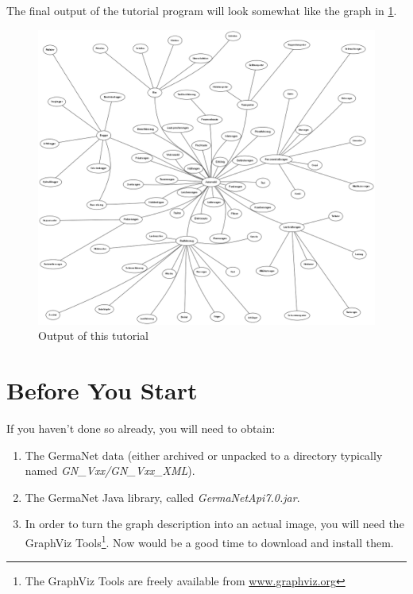 \documentclass[12pt,a4paper,english,utf8]{report}
\begin{document}
The final output of the tutorial program will look somewhat like the graph in \ref{autograph}.

\begin{figure}[htb] 
	\begin{center}
		\includegraphics[scale=0.3]{auto_graph.png}
	\end{center}
	\caption{Output of this tutorial}
	\label{autograph}
\end{figure}

\section{Before You Start}
\label{tutorialStarts}
If you haven't done so already, you will need to obtain:

\renewcommand{\labelenumi}{\arabic{enumi}}
\begin{enumerate}
	\item The GermaNet data (either archived or unpacked to a directory typically named \emph{GN\_Vxx/GN\_Vxx\_XML}).
	\item The GermaNet Java library, called \emph{GermaNetApi7.0.jar}.
	\item In order to turn the graph description into an actual image, you will need the GraphViz Tools\footnote{The GraphViz Tools are freely available from \href{www.graphviz.org}{www.graphviz.org}}. Now would be a good time to download and install them.
\end{enumerate}
\end{document}
